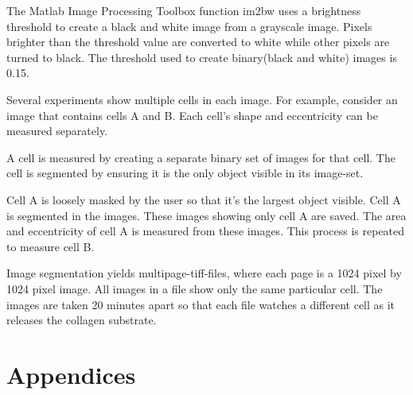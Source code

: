 \documentclass[ twocolumn,notitlepage]{ revtex4-1}
\begin{document}
The Matlab Image Processing Toolbox function im2bw uses a brightness threshold to create a black and white image from a grayscale image. Pixels brighter than the threshold value are converted to white while other pixels are turned to black. The threshold used to create binary(black and white) images is 0.15.

Several experiments show multiple cells in each image. For example, consider an image that contains cells A and B. Each cell's shape and eccentricity can be measured separately. 

A cell is measured by creating a separate binary set of images for that cell. The cell is segmented by ensuring it is the only object visible in its image-set.

Cell A is loosely masked by the user so that it's the largest object visible. Cell A is segmented in the images. These images showing only cell A are saved. The area and eccentricity of cell A is measured from these images. This process is repeated to measure cell B.

Image segmentation yields multipage-tiff-files, where each page is a 1024 pixel by 1024 pixel image. All images in a file show only the same particular cell. The images are taken 20 minutes apart so that each file watches a different cell as it releases the collagen substrate.

%
%

\newpage\section*{Appendices}
\end{document}
